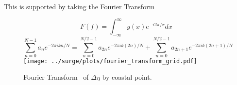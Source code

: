 \begin{frame}{This is  supported by taking the Fourier Transform }
\vspace{-40pt}
\begin{figure}[htb!]
    \centering
    \begin{equation}
F(f)=\int_{-\infty}^{\infty} y(x) e^{-i 2\pi f x} d x
\end{equation}
\begin{equation}
\sum_{n=0}^{N-1} a_{n} e^{-2 \pi i  k n/ N}=\sum_{n=0}^{N / 2-1} a_{2 n}
e^{-2 \pi i k (2 n)/ N} +\sum_{n=0}^{N / 2-1} a_{2n+1} e^{-2 \pi i k (2 n+1)/ N}
\end{equation}
    \texttt{[image: ../surge/plots/fourier\_transform\_grid.pdf]}
    \vspace{-7pt}
    \caption{Fourier Transform~\cite{cooley1965algorithm} of $\Delta\eta$ by coastal point.}
\end{figure}
\end{frame}
